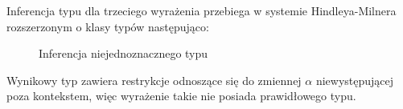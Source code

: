Inferencja typu dla trzeciego wyrażenia przebiega w systemie Hindleya-Milnera\cite{HM} rozszerzonym o klasy typów\cite{TC} następująco:
\begin{figure}[h]
\scriptsize 
\begin{mdframed}
\begin{prooftree}
 
  
  

\end{prooftree}
\end{mdframed}
\caption{Inferencja niejednoznacznego typu}
\end{figure}

Wynikowy typ zawiera restrykcje odnoszące się do zmiennej $\alpha$ niewystępującej poza kontekstem, więc wyrażenie takie nie posiada prawidłowego typu\cite{Report}.

